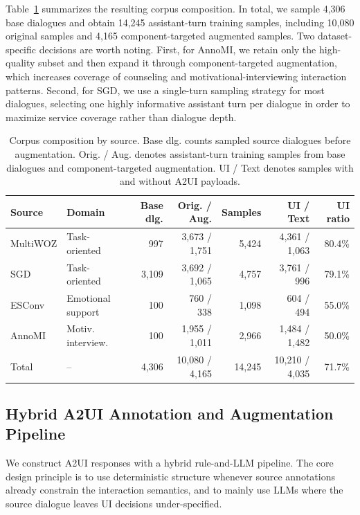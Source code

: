 \documentclass{llmxive}
\begin{document}
Table~\ref{tab:corpus_composition} summarizes the resulting corpus composition. In total,
we sample 4,306 base dialogues and obtain 14,245 assistant-turn training samples, including
10,080 original samples and 4,165 component-targeted augmented samples. Two dataset-specific
decisions are worth noting. First, for AnnoMI, we retain only the high-quality subset and then
expand it through component-targeted augmentation, which increases coverage of counseling
and motivational-interviewing interaction patterns. Second, for SGD, we use a single-turn
sampling strategy for most dialogues, selecting one highly informative assistant turn per
dialogue in order to maximize service coverage rather than dialogue depth.

\begin{table}[t]
\centering
\small
\setlength{\tabcolsep}{4pt}
\begin{tabular}{llrrrrr}
\toprule
Source & Domain & Base dlg. & Orig. / Aug. & Samples & UI / Text & UI ratio \\
\midrule
MultiWOZ & Task-oriented & 997 & 3,673 / 1,751 & 5,424 & 4,361 / 1,063 & 80.4\% \\
SGD & Task-oriented & 3,109 & 3,692 / 1,065 & 4,757 & 3,761 / 996 & 79.1\% \\
ESConv & Emotional support & 100 & 760 / 338 & 1,098 & 604 / 494 & 55.0\% \\
AnnoMI & Motiv. interview. & 100 & 1,955 / 1,011 & 2,966 & 1,484 / 1,482 & 50.0\% \\
\midrule
Total & -- & 4,306 & 10,080 / 4,165 & 14,245 & 10,210 / 4,035 & 71.7\% \\
\bottomrule
\end{tabular}
\caption{
Corpus composition by source. Base dlg. counts sampled source dialogues before augmentation.
Orig. / Aug. denotes assistant-turn training samples from base dialogues and component-targeted augmentation.
UI / Text denotes samples with and without A2UI payloads.
}
\label{tab:corpus_composition}
\end{table}

\subsection{Hybrid A2UI Annotation and Augmentation Pipeline}
\label{subsec:data-pipeline}

We construct A2UI responses with a hybrid rule-and-LLM pipeline. The core design principle is to use deterministic structure whenever source annotations already constrain the interaction semantics, and to mainly use LLMs where the source dialogue leaves UI decisions under-specified.
\end{document}

